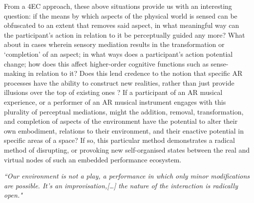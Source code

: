 From a 4EC approach, these above situations provide us with an interesting question: if the means by which aspects of the physical world is sensed can be obfuscated to an extent that removes said aspect, in what meaningful way can the participant's action in relation to it be perceptually guided any more? What about in cases wherein sensory mediation results in the transformation or `completion' of an aspect; in what ways does a participant's action potential change; how does this affect higher-order cognitive functions such as sense-making in relation to it? Does this lend credence to the notion that specific AR processes have the ability to construct new realities, rather than just provide illusions over the top of existing ones \citep[p. 230]{chalmers2022}? If a participant of an AR musical experience, or a performer of an AR musical instrument engages with this plurality of perceptual mediations, might the addition, removal, transformation, and completion of aspects of the environment have the potential to alter their own embodiment, relations to their environment, and their enactive potential in specific areas of a space? If so, this particular method demonstrates a radical method of disrupting, or provoking new self-organised states between the real and virtual nodes of such an embedded performance ecosystem.



\epigraph{\emph{``Our environment is not a play, a performance in which only minor modifications are possible. It's an improvisation,[…] the nature of the interaction is radically open."}}{\citep[]{vermeulen2015}}

